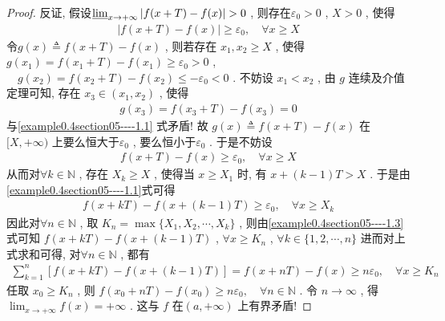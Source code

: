 \documentclass[../../main.tex]{subfiles}
\begin{document}
\begin{proof}
反证,
假设\(\varliminf_{x \to +\infty} \vert f(x + T) - f(x)\vert > 0\) , 则存在\(\varepsilon_0 > 0\) , \(X > 0\) , 使得
\begin{align}
\vert f(x + T) - f(x)\vert \geqslant \varepsilon_0,\quad \forall x \geqslant X \label{example0.4section05----1.1}
\end{align}
令\(g(x) \triangleq f(x + T) - f(x)\) , 则若存在 \(x_1, x_2 \geqslant X\) , 使得
\(g(x_1) = f(x_1 + T) - f(x_1) \geqslant \varepsilon_0 > 0\) , \(\quad g(x_2) = f(x_2 + T) - f(x_2) \leqslant -\varepsilon_0 < 0\) .
不妨设 \(x_1 < x_2\) , 由 \(g\) 连续及介值定理可知, 存在 \(x_3 \in (x_1, x_2)\) , 使得
\begin{align*}
g(x_3) = f(x_3 + T) - f(x_3) = 0
\end{align*}
与\eqref{example0.4section05----1.1} 式矛盾! 故 \(g(x) \triangleq f(x + T) - f(x)\) 在\([X, +\infty)\) 上要么恒大于\(\varepsilon_0\) , 要么恒小于\(\varepsilon_0\) . 于是不妨设
\begin{align}
f(x + T) - f(x) \geqslant \varepsilon_0,\quad \forall x \geqslant X \label{example0.4section05----1.2}
\end{align}
从而对\(\forall k \in \mathbb{N}\) , 存在 \(X_k \geqslant X\) , 使得当 \(x \geqslant X_1\) 时, 有
\(x + (k - 1)T > X\) .
于是由\eqref{example0.4section05----1.1}式可得
\begin{align}
f(x + kT) - f(x + (k - 1)T) \geqslant \varepsilon_0,\quad \forall x \geqslant X_k \label{example0.4section05----1.3}
\end{align}
因此对\(\forall n \in \mathbb{N}\) , 取 \(K_n = \max\{X_1, X_2, \cdots, X_k\}\) , 则由\eqref{example0.4section05----1.3}式可知
\(f(x + kT) - f(x + (k - 1)T)\) , \(\forall x \geqslant K_n\) , \(\forall k \in \{1, 2, \cdots, n\}\)
进而对上式求和可得, 对\(\forall n \in \mathbb{N}\) , 都有
\begin{align*}
\sum_{k = 1}^n [f(x + kT) - f(x + (k - 1)T)] = f(x + nT) - f(x) \geqslant n\varepsilon_0,\quad \forall x \geqslant K_n
\end{align*}
任取 \(x_0 \geqslant K_n\) , 则
\(f(x_0 + nT) - f(x_0) \geqslant n\varepsilon_0,\quad \forall n \in \mathbb{N}\) .
令 \(n \to \infty\) , 得\(\lim_{x \to +\infty} f(x) = +\infty\) . 这与 \(f\) 在\((a, +\infty)\) 上有界矛盾! 
\end{proof}
\end{document}
